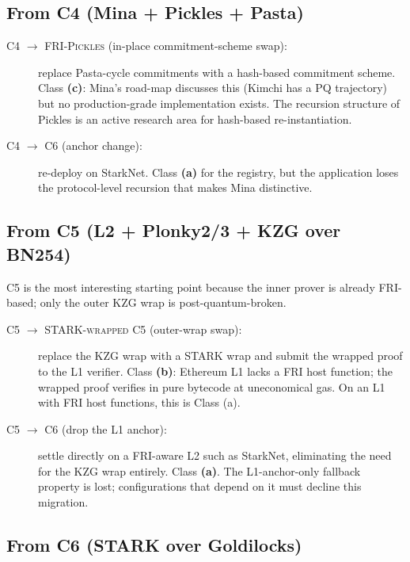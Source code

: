\subsection{From C4 (Mina + Pickles + Pasta)}
\label{sec:mig-c4}

\begin{description}
  \item[\textsc{C4 $\to$ FRI-Pickles} (in-place commitment-scheme
    swap):] replace Pasta-cycle commitments with a hash-based
    commitment scheme. Class \textbf{(c)}: Mina's road-map
    discusses this (Kimchi has a PQ trajectory) but no
    production-grade implementation exists. The recursion structure
    of Pickles is an active research area for hash-based
    re-instantiation.
  \item[\textsc{C4 $\to$ C6} (anchor change):] re-deploy on
    StarkNet. Class \textbf{(a)} for the registry, but the
    application loses the protocol-level recursion that makes Mina
    distinctive.
\end{description}

\subsection{From C5 (L2 + Plonky2/3 + KZG over BN254)}
\label{sec:mig-c5}

C5 is the most interesting starting point because the inner prover is
already FRI-based; only the outer KZG wrap is post-quantum-broken.

\begin{description}
  \item[\textsc{C5 $\to$ STARK-wrapped C5} (outer-wrap swap):]
    replace the KZG wrap with a STARK wrap and submit the wrapped
    proof to the L1 verifier. Class \textbf{(b)}: Ethereum L1 lacks
    a FRI host function; the wrapped proof verifies in pure bytecode
    at uneconomical gas. On an L1 with FRI host functions, this is
    Class (a).
  \item[\textsc{C5 $\to$ C6} (drop the L1 anchor):] settle directly
    on a FRI-aware L2 such as StarkNet, eliminating the need for the
    KZG wrap entirely. Class \textbf{(a)}. The L1-anchor-only
    fallback property is lost; configurations that depend on it must
    decline this migration.
\end{description}

\subsection{From C6 (STARK over Goldilocks)}
\label{sec:mig-c6}

